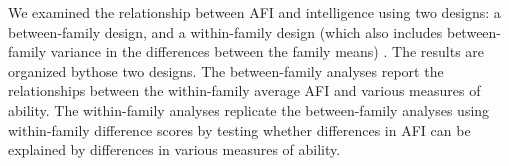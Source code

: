 We examined the relationship between AFI and intelligence using two designs: a between-family design, and a within-family design (which also includes between-family variance in the differences between the family means) . The results are organized bythose two designs. The between-family analyses report the relationships between the within-family average AFI and various measures of ability. The within-family analyses replicate the between-family analyses using within-family difference scores by testing whether differences in AFI can be explained by differences in various measures of ability.